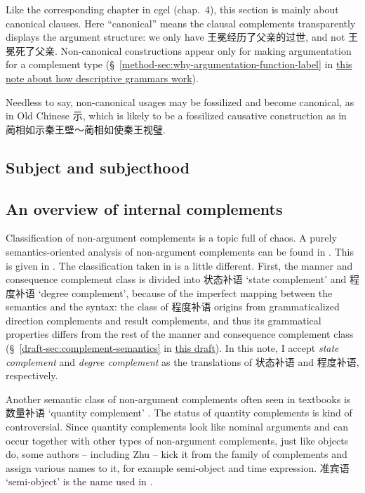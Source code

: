 \documentclass[UTF8, a4paper, oneside, scheme=plain]{ctexart}
\newcommand*{\citesec}[1]{\S~{#1}}
\newcommand*{\citechap}[1]{chap.~{#1}}
\newcommand*{\term}[1]{\emph{#1}}
\newcommand{\method}{\href{../methodology/glossing.pdf}{this note about how descriptive grammars work}}
\newcommand{\draft}{\href{./main.pdf}{this draft}}
\newcommand{\translate}[1]{`#1'}
\begin{document}
Like the corresponding chapter in \ac{cgel} (\citechap{4}),
this section is mainly about canonical clauses.
Here ``canonical'' means the clausal complements transparently displays the argument structure:
we only have 王冕经历了父亲的过世, and not 王冕死了父亲.
Non-canonical constructions appear only for making argumentation for a complement type
(\citesec{\ref{method-sec:why-argumentation-function-label}} in \method).

Needless to say, non-canonical usages may be fossilized
and become canonical, 
as in Old Chinese 示,
which is likely to be a fossilized causative construction as in
蔺相如示秦王壁～蔺相如使秦王视璧.

\subsection{Subject and subjecthood}


\subsection{An overview of internal complements}



Classification of non-argument complements is a topic full of chaos.
A purely semantics-oriented analysis of non-argument complements 
can be found in .
This is given in \cite[5.8]{xianhan2004}.
The classification taken in \citet{zhudexigrammar} is a little different.
First, the manner and consequence complement class 
is divided into 状态补语 \translate{state complement}
and 程度补语 \translate{degree complement},
because of the imperfect mapping 
between the semantics and the syntax: 
the class of 程度补语 origins from grammaticalized direction complements and result complements,
and thus its grammatical properties differs from the rest of the manner and consequence complement class
(\citesec{\ref{draft-sec:complement-semantics}} in \draft).
In this note, I accept \term{state complement} and \term{degree complement}
as the translations of 状态补语 and 程度补语, respectively.

Another semantic class of non-argument complements often seen in textbooks is 
数量补语 \translate{quantity complement} \citep[\citesec{7.1}]{zhuqingming2005}.
The status of quantity complements  is kind of controversial.
Since quantity complements look like nominal arguments 
and can occur together with other types of non-argument complements, 
just like objects do, some authors -- including Zhu -- 
kick it from the family of complements and assign various names to it, 
for example semi-object and time expression. 
准宾语 \translate{semi-object} is the name used in \citet{zhudexigrammar}. %
\end{document}
